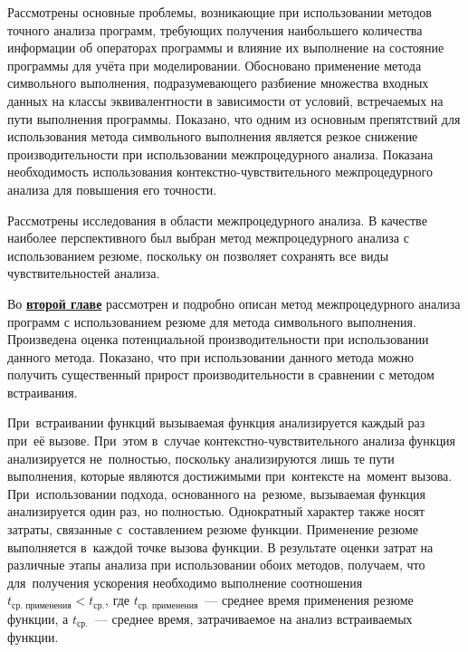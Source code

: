 Рассмотрены основные проблемы, возникающие при использовании методов точного анализа программ, требующих получения наибольшего количества информации об операторах программы и влияние их выполнение на состояние программы для учёта при моделировании. Обосновано применение метода символьного выполнения, подразумевающего разбиение множества входных данных на классы эквивалентности в зависимости от условий, встречаемых на пути выполнения программы. Показано, что одним из основным препятствий для использования метода символьного выполнения является резкое снижение производительности при использовании межпроцедурного анализа. Показана необходимость использования контекстно-чувствительного межпроцедурного анализа для повышения его точности.

Рассмотрены исследования в области межпроцедурного анализа. В качестве наиболее перспективного был выбран метод межпроцедурного анализа с использованием резюме, поскольку он позволяет сохранять все виды чувствительностей анализа.


Во \underline{\textbf{второй главе}} рассмотрен и подробно описан метод межпроцедурного анализа программ с использованием резюме для метода символьного выполнения. Произведена оценка потенциальной производительности при использовании данного метода. Показано, что при использовании данного метода можно получить существенный прирост производительности в сравнении с методом встраивания.

При~встраивании функций вызываемая функция анализируется каждый раз при~её вызове. При~этом в~случае контекстно-чувствительного анализа функция анализируется не~полностью, поскольку анализируются лишь те пути выполнения, которые являются достижимыми при~контексте на~момент вызова. При~использовании подхода, основанного на~резюме, вызываемая функция анализируется один раз, но полностью. Однократный характер также носят затраты, связанные с~составлением резюме функции. Применение резюме выполняется в~каждой точке вызова функции. В результате оценки затрат на различные этапы анализа при использовании обоих методов, получаем, что для~получения ускорения необходимо выполнение соотношения $t_{\text{ср. применения}} <  t_{\text{ср.}}$, где $t_{\text{ср. применения}}$~--- среднее время применения резюме функции, а $t_{\text{ср.}}$~--- среднее время, затрачиваемое на анализ встраиваемых функции.

